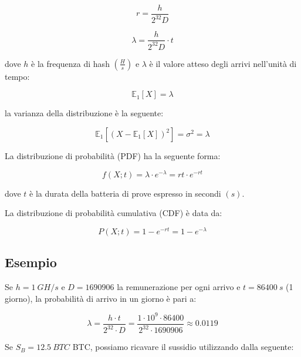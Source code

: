 \documentclass{article}
\begin{document}
\begin{equation}
    r = \frac{h}{2^{32}D} \label{rate}
\end{equation}

\begin{equation}
    \lambda = \frac{h}{2^{32}D} \cdot t \label{lambda}
\end{equation}

dove $h$ è la frequenza di hash $(\frac{H}{s})$ e $\lambda$ è il valore atteso degli arrivi nell'unità di tempo:

\begin{equation}
    \mathbb{E}_{1}[X] = \lambda \label{E_lambda}
\end{equation}

la varianza della distribuzione è la seguente:

\begin{equation}
    \mathbb{E}_{1}[ ( X - \mathbb{E}_{1}[X] )^2 ] = \sigma^{2} = \lambda \label{sigma2_lambda}
\end{equation}

La distribuzione di probabilità (PDF) ha la seguente forma:

\begin{equation}
    f(X; t) = \lambda \cdot e^{-\lambda} = rt \cdot e^{-rt}
\end{equation}

dove $t$ è la durata della batteria di prove espresso in  secondi $(s)$.

La distribuzione di probabilità cumulativa (CDF) è data da:

\begin{equation}
    P(X; t) = 1 - e^{-rt} = 1 - e^{-\lambda} \label{eq:CDF}
\end{equation}

\subsection{Esempio}

Se $h = 1 \ GH/s$ e $D = 1690906$ la remunerazione per ogni arrivo e $t = 86400 \ s$ (1 giorno), la probabilità di arrivo in un giorno è pari a:

\begin{equation}
    \lambda = \frac{h \cdot t}{2^{32} \cdot D} = \frac{1 \cdot 10^{9} \cdot 86400}{2^{32} \cdot 1690906} \approx 0.0119
\end{equation}

Se $S_{B} = 12.5 \ BTC$ BTC, possiamo ricavare il sussidio utilizzando dalla seguente:
\end{document}
